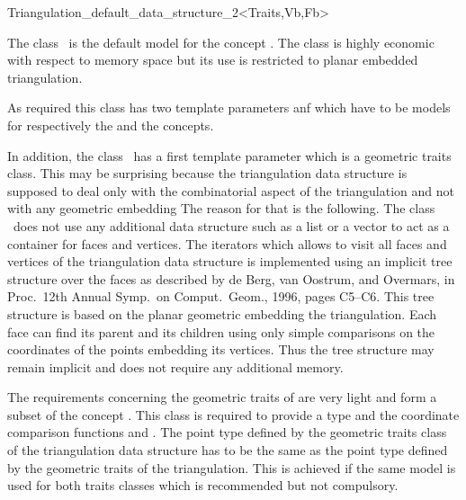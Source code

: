 

\begin{ccRefClass}{Triangulation_default_data_structure_2<Traits,Vb,Fb>} 

\ccDefinition
  
The class \ccRefName\ is the default model for the concept
.
The class \ccRefName 
is highly economic with respect to memory space but its use is
restricted
to planar embedded triangulation.

As required this class has two template parameters  anf 
which have 
to be models for respectively the
 and 
the  concepts.

In addition, the class \ccClassTemplateName\ has a first template parameter
which is a geometric traits class. This may be surprising because
the triangulation data structure is supposed to deal only with the combinatorial
aspect of the triangulation and not with any geometric embedding
The reason for that is the following.
The class \ccRefName\ does not use any additional data structure
such as a list or a vector to act as a container for faces and vertices.
The iterators which allows to visit all faces and vertices of the
triangulation
data structure
is implemented using  an implicit tree structure over the faces
as described by
 de Berg, van Oostrum, and Overmars, 
in Proc.\ 12th Annual Symp.\ on Comput.\ Geom.,
1996, pages C5--C6. This tree structure is  based on the planar
geometric embedding
the triangulation. Each face 
 can find its parent 
and its children using only simple comparisons on the
coordinates of the points embedding its vertices.
Thus the tree structure may remain implicit 
and does not require any additional memory. 

The requirements concerning the geometric traits  of
 are very light and form a subset of the concept
.
This class is required  to provide a type 
and the coordinate comparison functions  and
. The point type
defined by the geometric traits class of the triangulation data structure
has to be the same 
as the point type defined by the geometric traits of the triangulation.
This is achieved if the same model is used for both traits classes
which is recommended but not compulsory.



\end{ccRefClass}
